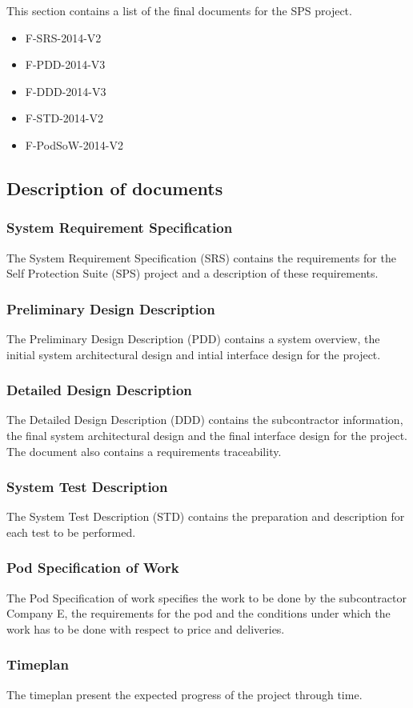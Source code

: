 This section contains a list of the final documents for the SPS project.\\
\begin{itemize}
\item F-SRS-2014-V2
\item F-PDD-2014-V3
\item F-DDD-2014-V3
\item F-STD-2014-V2
\item F-PodSoW-2014-V2\\
\end{itemize}

\subsection{Description of documents}
\subsubsection{System Requirement Specification}
The System Requirement Specification (SRS) contains the requirements for the Self Protection Suite (SPS) project and a description of these requirements.\\
\subsubsection{Preliminary Design Description}
The Preliminary Design Description (PDD) contains a system overview, the initial system architectural design and intial interface design for the project.\\
\subsubsection{Detailed Design Description}
The Detailed Design Description (DDD) contains the subcontractor information, the final system architectural design and the final interface design for the project. The document also contains a requirements traceability.\\
\subsubsection{System Test Description}
The System Test Description (STD) contains  the preparation and description for each test to be performed.\\
\subsubsection{Pod Specification of Work}
The Pod Specification of work specifies the work to be done by the subcontractor Company E, the requirements for the pod and the conditions under which the work has to be done with respect to price and deliveries.
\subsubsection{Timeplan}
The timeplan present the expected progress of the project through time.
